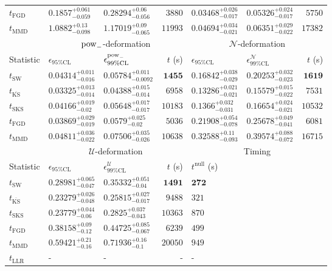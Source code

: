 \begin{tabular}{l|llr|llr}
	$t_{\mathrm{FGD}}$ & ${\mathbf{0.1857_{-0.059}^{+0.061}}}$ & ${\mathbf{0.28294_{-0.056}^{+0.06}}}$ & $3880$ & ${\mathbf{0.03468_{-0.017}^{+0.026}}}$ & $0.05326_{-0.017}^{+0.024}$ & $5750$ \\
	$t_{\mathrm{MMD}}$ & $1.0882_{-0.098}^{+0.13}$ & $1.17019_{-0.065}^{+0.09}$ & $11993$ & $0.04694_{-0.021}^{+0.034}$ & $0.06351_{-0.022}^{+0.029}$ & $17382$ \\
	\toprule
	\multicolumn{1}{c}{} & \multicolumn{3}{c}{$\rm{pow}_{-}$-deformation} & \multicolumn{3}{c}{$\mathcal{N}$-deformation} \\
	Statistic & $\epsilon_{95\%\mathrm{CL}}$ & $\epsilon^  {\rm{pow}_{-}}_{99\%\mathrm{CL}}$ & $t$ (s) & $\epsilon_{95\%\mathrm{CL}}$ & $\epsilon^    {\mathcal{N}}_{99\%\mathrm{CL}}$ & $t$ (s) \\
	\midrule
	$t_{\mathrm{SW}}$ & $0.04314_{-0.016}^{+0.011}$ & $0.05784_{-0.0092}^{+0.011}$ & ${\mathbf{1455}}$ & $0.16842_{-0.029}^{+0.038}$ & $0.20253_{-0.023}^{+0.032}$ & ${\mathbf{1619}}$ \\
	$t_{\overline{\mathrm{KS}}}$ & ${\mathbf{0.03325_{-0.014}^{+0.013}}}$ & ${\mathbf{0.04388_{-0.014}^{+0.015}}}$ & $6958$ & ${\mathbf{0.13286_{-0.021}^{+0.021}}}$ & ${\mathbf{0.15579_{-0.022}^{+0.015}}}$ & $7531$ \\
	$t_{\mathrm{SKS}}$ & $0.04166_{-0.02}^{+0.019}$ & $0.05648_{-0.017}^{+0.017}$ & $10183$ & $0.1366_{-0.031}^{+0.032}$ & $0.16654_{-0.021}^{+0.024}$ & $10532$ \\
	$t_{\mathrm{FGD}}$ & $0.03869_{-0.019}^{+0.029}$ & $0.0579_{-0.02}^{+0.025}$ & $5036$ & $0.21908_{-0.078}^{+0.054}$ & $0.25678_{-0.041}^{+0.049}$ & $6081$ \\
	$t_{\mathrm{MMD}}$ & $0.04811_{-0.022}^{+0.036}$ & $0.07506_{-0.026}^{+0.035}$ & $10638$ & $0.32588_{-0.093}^{+0.11}$ & $0.39574_{-0.072}^{+0.088}$ & $16715$ \\
	\toprule
	\multicolumn{1}{c}{} & \multicolumn{3}{c}{$\mathcal{U}$-deformation} & \multicolumn{3}{c}{Timing} \\
	Statistic & $\epsilon_{95\%\mathrm{CL}}$ & $\epsilon^    {\mathcal{U}}_{99\%\mathrm{CL}}$ & $t$ (s) & $t^{\mathrm{null}}$ (s) \\
	\midrule
	$t_{\mathrm{SW}}$ & $0.28981_{-0.047}^{+0.065}$ & $0.35332_{-0.04}^{+0.051}$ & ${\mathbf{1491}}$ & ${\mathbf{272}}$ \\
	$t_{\overline{\mathrm{KS}}}$ & ${\mathbf{0.23279_{-0.048}^{+0.026}}}$ & ${\mathbf{0.25815_{-0.017}^{+0.027}}}$ & $9488$ & $321$ \\
	$t_{\mathrm{SKS}}$ & $0.23779_{-0.06}^{+0.044}$ & $0.2825_{-0.043}^{+0.037}$ & $10363$ & $870$ \\
	$t_{\mathrm{FGD}}$ & $0.38158_{-0.12}^{+0.09}$ & $0.44725_{-0.067}^{+0.085}$ & $6239$ & $499$ \\
	$t_{\mathrm{MMD}}$ & $0.59421_{-0.16}^{+0.21}$ & $0.71936_{-0.1}^{+0.16}$ & $20050$ & $949$ \\
	$t_{\mathrm{LLR}}$ & - & - & - & - \\
	\bottomrule
\end{tabular}